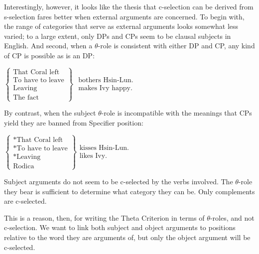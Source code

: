 Interestingly, however, it looks like the thesis that c-selection can be derived from s-selection fares better when external arguments are concerned. To begin with, the range of categories that serve as external arguments looks somewhat less varied; to a large extent, only DPs and CPs seem to be clausal subjects in English. %
%
%
% 
And second, when a \mbox{$\theta$-role} is consistent with either DP and CP, any kind of CP is possible as is an DP:
\begin{exe}
	\ex \label{ex2:54} $\left\{ \begin{array}{l} \text{That\ Coral\ left}\\ \text{To\ have\ to\ leave}\\ \text{Leaving}\\ \text{The\ fact} \end{array} \right\}$ $\begin{array}{l} \text{bothers\ Hsin-Lun.}\\ \text{makes\ Ivy\ happy.} \end{array}$
\end{exe}
By contrast, when the subject $\theta$-role is incompatible with the meanings that CPs yield they are banned from Specifier position:
\begin{exe}
	\ex \label{ex2:55} $\left\{ \begin{array}{l} *\text{That\ Coral\ left}\\ *\text{To\ have\ to\ leave}\\ *\text{Leaving}\\ \text{Rodica} \end{array} \right\} \begin{array}{l} \text{kisses\ Hsin-Lun.}\\ \text{likes\ Ivy.} \end{array}$
\end{exe}
Subject arguments do not seem to be c-selected by the verbs involved. The $\theta$-role they bear is sufficient to determine what category they can be. Only complements are c-selected.

This is a reason, then, for writing the Theta Criterion in terms of \mbox{$\theta$-roles}, and not \mbox{c-selection}. We want to link both subject and object arguments to positions relative to the word they are arguments of, but only the object argument will be \mbox{c-selected}.


